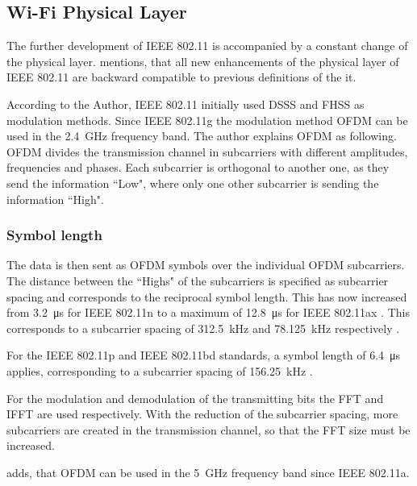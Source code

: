 \subsection*{Wi-Fi Physical Layer}
The further development of IEEE 802.11 is accompanied by a constant change of the physical layer. \textcite{sauter_wireless_2022} mentions, that all new enhancements of the physical layer of IEEE 802.11 are backward compatible to previous definitions of the it.

According to the Author, IEEE 802.11 initially used DSSS and FHSS as modulation methods.
Since IEEE 802.11g the modulation method \ac{OFDM} can be used in the \SI{2.4}{\giga\hertz} frequency band.
The author explains \ac{OFDM} as following. \ac{OFDM} divides the transmission channel in subcarriers with different
amplitudes, frequencies and phases. Each subcarrier is orthogonal to another one, as they send the information ``Low",
where only one other subcarrier is sending the information ``High".

\subsubsection*{Symbol length}
The data is then sent as \ac{OFDM} symbols over the individual \ac{OFDM} subcarriers.
The distance between the ``Highs" of the subcarriers is specified as subcarrier spacing and corresponds to the reciprocal
symbol length. This has now increased from \SI{3.2}{\micro\second} for IEEE 802.11n  to a maximum of \SI{12.8}{\micro\second} for IEEE 802.11ax \cite{sauter_wireless_2022}.
This corresponds to a subcarrier spacing of \SI{312.5}{\kilo\hertz} and \SI{78.125}{\kilo\hertz} respectively \cite{sauter_wireless_2022}.

For the IEEE 802.11p and IEEE 802.11bd standards, a symbol length of \SI{6.4}{\micro\second} applies, corresponding to a subcarrier spacing of \SI{156.25}{\kilo\hertz} \cite{jacob_system-level_2020}.

For the modulation and demodulation of the transmitting bits the FFT and IFFT are used respectively. With the reduction of the subcarrier spacing, more subcarriers are created in the transmission channel, so that the FFT size must be increased. 

\textcite{kauffels_wireless_2002} adds, that \ac{OFDM} can be used in the \SI{5}{\giga\hertz} frequency band since IEEE 802.11a. 

